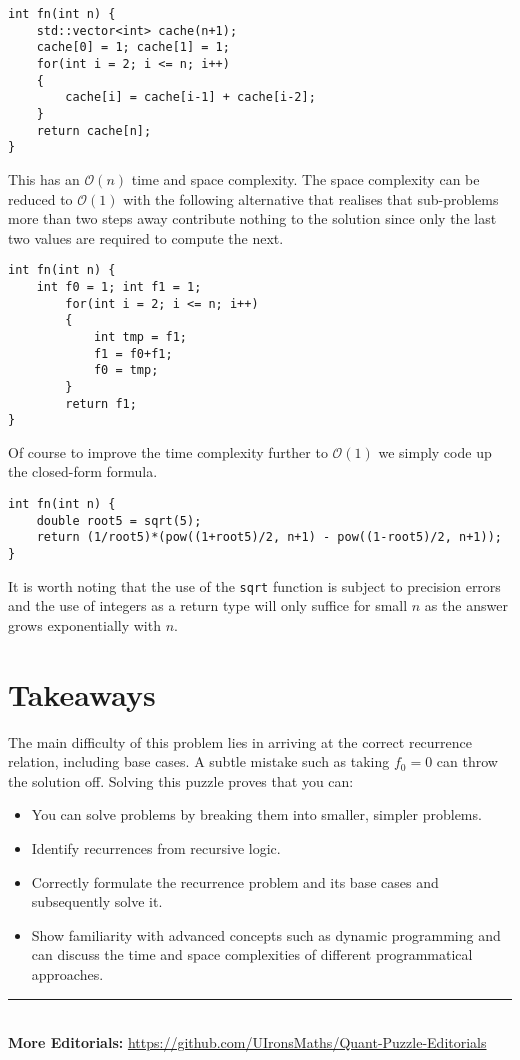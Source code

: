 \documentclass[12pt]{article}
\begin{document}
\begin{lstlisting}[style=cppstyle]
int fn(int n) {
    std::vector<int> cache(n+1);
    cache[0] = 1; cache[1] = 1;
    for(int i = 2; i <= n; i++)
    {
        cache[i] = cache[i-1] + cache[i-2];
    }
    return cache[n];
}
\end{lstlisting}

This has an $\mathcal{O}(n)$ time and space complexity. The space complexity can be reduced to $\mathcal{O}(1)$ with the following alternative that realises that sub-problems more than two steps away contribute nothing to the solution since only the last two values are required to compute the next.

\begin{lstlisting}[style=cppstyle]
int fn(int n) {
    int f0 = 1; int f1 = 1;
        for(int i = 2; i <= n; i++)
        {
            int tmp = f1;
            f1 = f0+f1;
            f0 = tmp;
        }
        return f1;
}
\end{lstlisting}

Of course to improve the time complexity further to $\mathcal{O}(1)$ we simply code up the closed-form formula.

\begin{lstlisting}[style=cppstyle]
int fn(int n) {
    double root5 = sqrt(5);
    return (1/root5)*(pow((1+root5)/2, n+1) - pow((1-root5)/2, n+1));
}
\end{lstlisting}

It is worth noting that the use of the \texttt{sqrt} function is subject to precision errors and the use of integers as a return type will only suffice for small $n$ as the answer grows exponentially with $n$.

\section*{Takeaways}
The main difficulty of this problem lies in arriving at the correct recurrence relation, including base cases. A subtle mistake such as taking $f_0=0$ can throw the solution off. Solving this puzzle proves that you can:

\begin{itemize}
    \item You can solve problems by breaking them into smaller, simpler problems.
    \item Identify recurrences from recursive logic.
    \item Correctly formulate the recurrence problem and its base cases and subsequently solve it.
    \item Show familiarity with advanced concepts such as dynamic programming and can discuss the time and space complexities of different programmatical approaches.
\end{itemize}

\vspace*{\fill}
\begin{center}
    \rule{\linewidth}{0.5pt} \\
    \textbf{More Editorials:} \href{https://github.com/UIronsMaths/Quant-Puzzle-Editorials}{https://github.com/UIronsMaths/Quant-Puzzle-Editorials}
\end{center}
\end{document}
